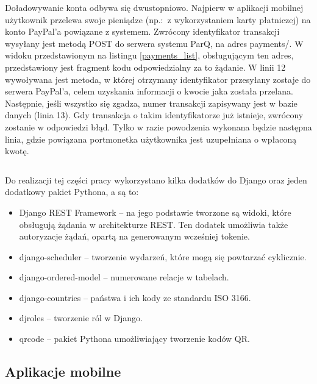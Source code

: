 Doładowywanie konta odbywa się dwustopniowo. Najpierw w aplikacji mobilnej użytkownik przelewa swoje pieniądze (np.:~z wykorzystaniem karty płatniczej) na konto PayPal'a powiązane z systemem. Zwrócony identyfikator transakcji wysyłany jest metodą POST do serwera systemu ParQ, na adres payments/. W widoku przedstawionym na listingu \ref{payments_list}, obsługującym ten adres, przedstawiony jest fragment kodu odpowiedzialny za to żądanie. W linii 12 wywoływana jest metoda, w której otrzymany identyfikator przesyłany zostaje do serwera PayPal'a, celem uzyskania informacji o kwocie jaka została przelana. Następnie, jeśli wszystko się zgadza, numer transakcji zapisywany jest w bazie danych (linia 13). Gdy transakcja o takim identyfikatorze już istnieje, zwrócony zostanie w odpowiedzi błąd. Tylko w razie powodzenia wykonana będzie następna linia, gdzie powiązana portmonetka użytkownika jest uzupełniana o wpłaconą kwotę.

\begin{singlespace}
	\label{payments_list}
	\vspace{0.3cm}
	\inputminted[fontsize=\footnotesize, linenos=true]{python}{src/imp/paypal-views.py}
\end{singlespace}

\vspace{0.3cm}

Do realizacji tej części pracy wykorzystano kilka dodatków do Django oraz jeden dodatkowy pakiet Pythona, a są to:
\begin{itemize}
	\item Django REST Framework -- na jego podstawie tworzone są widoki, które obsługują żądania w architekturze REST. Ten dodatek umożliwia także autoryzacje żądań, opartą na generowanym wcześniej tokenie.
	\item django-scheduler -- tworzenie wydarzeń, które mogą się powtarzać cyklicznie.
	\item django-ordered-model -- numerowane relacje w tabelach.
	\item django-countries -- państwa i ich kody ze standardu ISO 3166.
	\item djroles -- tworzenie ról w Django.
	\item qrcode -- pakiet Pythona umożliwiający tworzenie kodów QR.
\end{itemize}

\subsection{Aplikacje mobilne}

